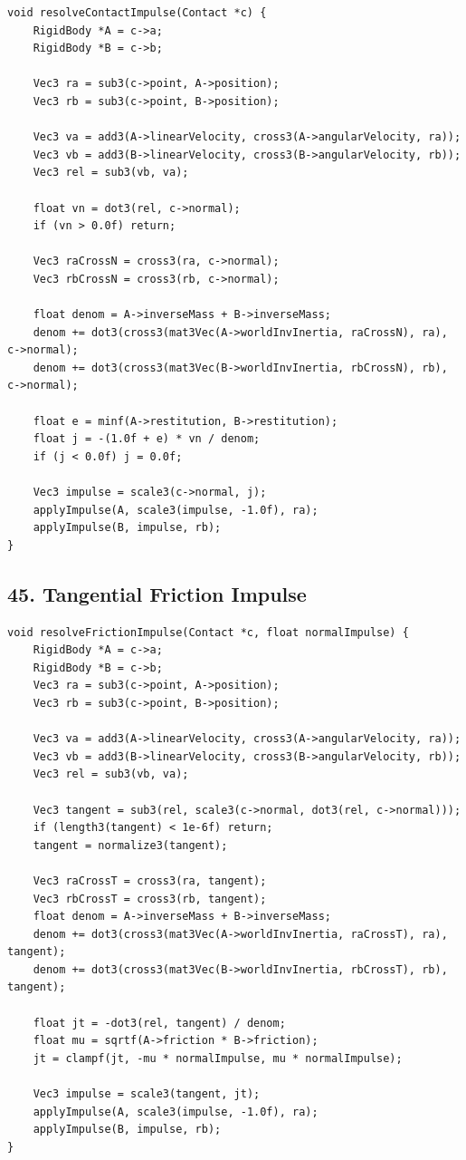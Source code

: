 \documentclass[10pt,letterpaper]{article}
\begin{document}
\begin{verbatim}
void resolveContactImpulse(Contact *c) {
    RigidBody *A = c->a;
    RigidBody *B = c->b;

    Vec3 ra = sub3(c->point, A->position);
    Vec3 rb = sub3(c->point, B->position);

    Vec3 va = add3(A->linearVelocity, cross3(A->angularVelocity, ra));
    Vec3 vb = add3(B->linearVelocity, cross3(B->angularVelocity, rb));
    Vec3 rel = sub3(vb, va);

    float vn = dot3(rel, c->normal);
    if (vn > 0.0f) return;

    Vec3 raCrossN = cross3(ra, c->normal);
    Vec3 rbCrossN = cross3(rb, c->normal);

    float denom = A->inverseMass + B->inverseMass;
    denom += dot3(cross3(mat3Vec(A->worldInvInertia, raCrossN), ra), c->normal);
    denom += dot3(cross3(mat3Vec(B->worldInvInertia, rbCrossN), rb), c->normal);

    float e = minf(A->restitution, B->restitution);
    float j = -(1.0f + e) * vn / denom;
    if (j < 0.0f) j = 0.0f;

    Vec3 impulse = scale3(c->normal, j);
    applyImpulse(A, scale3(impulse, -1.0f), ra);
    applyImpulse(B, impulse, rb);
}
\end{verbatim}

\subsection*{45. Tangential Friction Impulse}

\begin{verbatim}
void resolveFrictionImpulse(Contact *c, float normalImpulse) {
    RigidBody *A = c->a;
    RigidBody *B = c->b;
    Vec3 ra = sub3(c->point, A->position);
    Vec3 rb = sub3(c->point, B->position);

    Vec3 va = add3(A->linearVelocity, cross3(A->angularVelocity, ra));
    Vec3 vb = add3(B->linearVelocity, cross3(B->angularVelocity, rb));
    Vec3 rel = sub3(vb, va);

    Vec3 tangent = sub3(rel, scale3(c->normal, dot3(rel, c->normal)));
    if (length3(tangent) < 1e-6f) return;
    tangent = normalize3(tangent);

    Vec3 raCrossT = cross3(ra, tangent);
    Vec3 rbCrossT = cross3(rb, tangent);
    float denom = A->inverseMass + B->inverseMass;
    denom += dot3(cross3(mat3Vec(A->worldInvInertia, raCrossT), ra), tangent);
    denom += dot3(cross3(mat3Vec(B->worldInvInertia, rbCrossT), rb), tangent);

    float jt = -dot3(rel, tangent) / denom;
    float mu = sqrtf(A->friction * B->friction);
    jt = clampf(jt, -mu * normalImpulse, mu * normalImpulse);

    Vec3 impulse = scale3(tangent, jt);
    applyImpulse(A, scale3(impulse, -1.0f), ra);
    applyImpulse(B, impulse, rb);
}
\end{verbatim}
\end{document}
